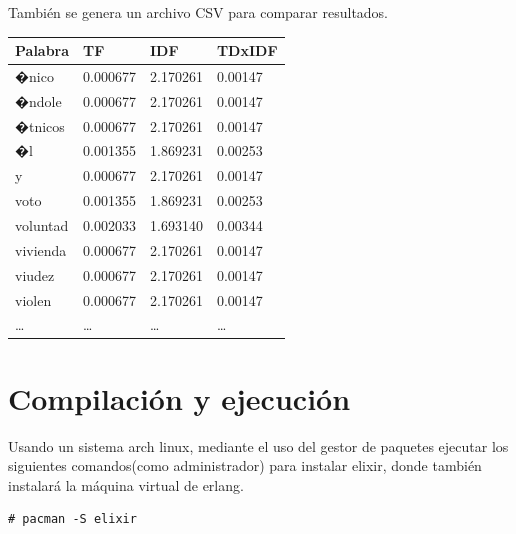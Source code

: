 \documentclass{IEEEtran}
\begin{document}
También se genera un archivo CSV para comparar resultados.
\begin{table}[H]
  \centering{}
  \begin{tabular}{|l|l|l|l|}
    \hline
    Palabra  & TF                & IDF              & TDxIDF            \\ \hline
    �nico    & 0.000677 & 2.170261 & 0.00147 \\ \hline
    �ndole   & 0.000677 & 2.170261 & 0.00147 \\ \hline
    �tnicos  & 0.000677 & 2.170261 & 0.00147 \\ \hline
    �l       & 0.001355  & 1.869231 & 0.00253 \\ \hline
    y        & 0.000677 & 2.170261 & 0.00147 \\ \hline
    voto     & 0.001355  & 1.869231 & 0.00253 \\ \hline
    voluntad & 0.002033 & 1.693140  & 0.00344 \\ \hline
    vivienda & 0.000677 & 2.170261 & 0.00147 \\ \hline
    viudez   & 0.000677 & 2.170261 & 0.00147 \\ \hline
    violen   & 0.000677 & 2.170261 & 0.00147 \\ \hline
    \ldots   & \ldots & \ldots & \ldots \\ \hline
  \end{tabular}



\end{table}

\section{Compilación y ejecución}\label{sec:compilacion}

Usando un sistema arch linux,
mediante el uso del gestor de paquetes ejecutar los siguientes
comandos(como administrador) para instalar elixir, donde también instalará
la máquina virtual de erlang.

\begin{verbatim}
# pacman -S elixir
\end{verbatim}
\end{document}
